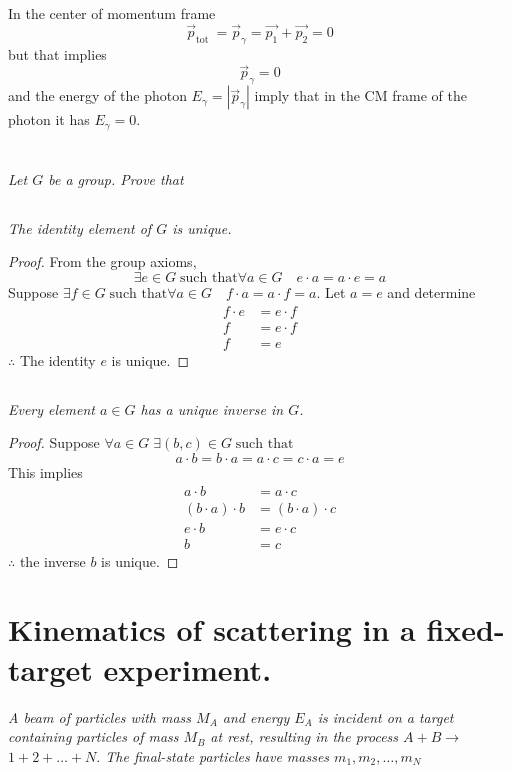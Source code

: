 \documentclass{article}
\begin{document}
In the center of momentum frame
$$
\vec{p}_{\text {tot }}=\vec{p}_{\gamma}=\vec{p_1}+\vec{p_2}=0
$$
but that implies
$$
\vec{p}_{\gamma}=0
$$
and the energy of the photon $E_{\gamma} = \left|\vec{p}_\gamma\right|$ imply that in the CM frame of the photon it has $E_\gamma = 0$.



\newpage


\section{}
\textit{Let $G$ be a group. Prove that}

\subsection{}
\textit{The identity element of $G$ is unique.}

\begin{proof}
From the group axioms,
$$
\exists e \in G \; \text {such that} \forall a \in G \quad e \cdot a=a \cdot e=a
$$
Suppose $\exists f \in G \; \text {such that} \forall a \in G \quad f \cdot a=a \cdot f=a$. Let $a = e$ and determine 
\begin{align*}
    f \cdot e  &= e \cdot f  \\
    f  &=  e \cdot f \\
    f &=e
\end{align*}
$\therefore$ The identity $e$ is unique.
\end{proof}


\subsection{}
\textit{Every element $a \in G$ has a unique inverse in $G$.}

\begin{proof}
Suppose $\forall a \in G \; \exists (b,c) \in G \; \text {such that} $
$$
a \cdot b=b \cdot a=a \cdot c=c \cdot a=e
$$
This implies 
\begin{align*}
a \cdot b &= a \cdot c \\
(b \cdot a) \cdot b &= (b\cdot a) \cdot c \\
e \cdot b &= e \cdot c \\
b &= c
\end{align*}
$\therefore$ the inverse $b$ is unique.
\end{proof}

\newpage


\section{Kinematics of scattering in a fixed-target experiment.}
\textit{A beam of particles with mass $M_{A}$ and energy $E_{A}$ is incident on a target containing particles of mass $M_{B}$ at rest, resulting in the process $A+B \rightarrow$ $1+2+\ldots+N .$ The final-state particles have masses $m_{1}, m_{2}, \ldots, m_{N}$}
\end{document}
